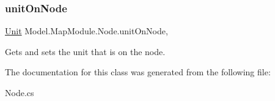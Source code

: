 \subsubsection{\texorpdfstring{unit\+On\+Node}{unitOnNode}}
{\footnotesize\ttfamily \hyperlink{interface_model_1_1_unit_module_1_1_unit}{Unit} Model.\+Map\+Module.\+Node.\+unit\+On\+Node\hspace{0.3cm}{\ttfamily [get]}, {\ttfamily [set]}}

Gets and sets the unit that is on the node. 

The documentation for this class was generated from the following file\+:\begin{DoxyCompactItemize}
\item 
Node.\+cs\end{DoxyCompactItemize}
